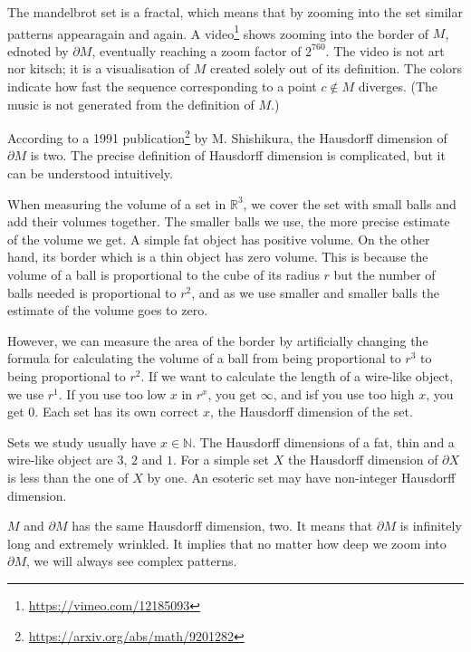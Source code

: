 \documentclass[11pt,oneside,%
]{memoir}
\newcommand{\NN}{\mathbb{N}}
\newcommand{\RR}{\mathbb{R}}
\begin{document}
The mandelbrot set is a fractal, which means that by zooming into the set similar patterns appearagain and again. A video\footnote{\url{https://vimeo.com/12185093}} shows zooming into the border of \(M\), ednoted by \(\partial M\), eventually reaching a zoom factor of \(2^{760}\). The video is not art nor kitsch; it is a visualisation of \(M\) created solely out of its definition. The colors indicate how fast the sequence corresponding to a point \(c\notin M\) diverges. (The music is not generated from the definition of \(M\).)

According to a 1991 publication\footnote{\url{https://arxiv.org/abs/math/9201282}} by M. Shishikura, the Hausdorff dimension of \(\partial M\) is two. The precise definition of Hausdorff dimension is complicated, but it can be understood intuitively.

When measuring the volume of a set in \(\RR^3\), we cover the set with small balls and add their volumes together. The smaller balls we use, the more precise estimate of the volume we get. A simple fat object has positive volume. On the other hand, its border which is a thin object has zero volume. This is because the volume of a ball is proportional to the cube of its radius \(r\) but the number of balls needed is proportional to \(r^2\), and as we use smaller and smaller balls the estimate of the volume goes to zero.

However, we can measure the area of the border by artificially changing the formula for calculating the volume of a ball from being proportional to \(r^3\) to being proportional to \(r^2\). If we want to calculate the length of a wire-like object, we use \(r^1\). If you use too low \(x\) in \(r^x\), you get \(\infty\), and isf you use too high \(x\), you get \(0\). Each set has its own correct \(x\), the Hausdorff dimension of the set.

Sets we study usually have \(x\in\NN\). The Hausdorff dimensions of a fat, thin and a wire-like object are \(3\), \(2\) and \(1\). For a simple set \(X\) the Hausdorff dimension of \(\partial X\) is less than the one of \(X\) by one. An esoteric set may have non-integer Hausdorff dimension. 

\(M\) and \(\partial M\) has the same Hausdorff dimension, two. It means that \(\partial M\) is infinitely long and extremely wrinkled. It implies that no matter how deep we zoom into \(\partial M\), we will always see complex patterns.
\end{document}

